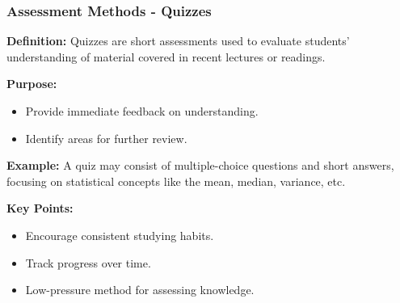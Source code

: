 \documentclass[aspectratio=169]{beamer}
\begin{document}
\begin{frame}[fragile]
    \frametitle{Assessment Methods - Quizzes}
    \textbf{Definition:} Quizzes are short assessments used to evaluate students' understanding of material covered in recent lectures or readings.

    \textbf{Purpose:}
    \begin{itemize}
        \item Provide immediate feedback on understanding.
        \item Identify areas for further review.
    \end{itemize}

    \textbf{Example:} A quiz may consist of multiple-choice questions and short answers, focusing on statistical concepts like the mean, median, variance, etc.

    \textbf{Key Points:}
    \begin{itemize}
        \item Encourage consistent studying habits.
        \item Track progress over time.
        \item Low-pressure method for assessing knowledge.
    \end{itemize}
\end{frame}
\end{document}
